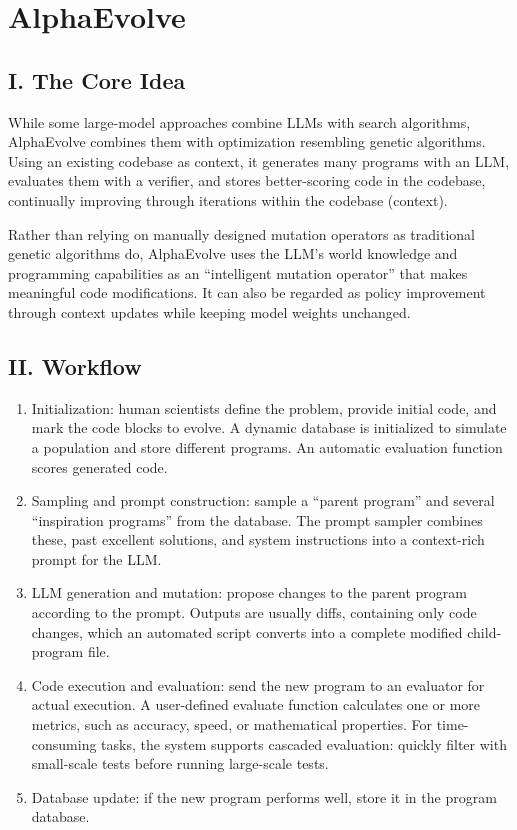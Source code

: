 \setcounter{section}{2}

\hypertarget{alphaevolve}{%
\section{AlphaEvolve}\label{alphaevolve}}

\hypertarget{i.-the-core-idea-2}{%
\subsection{I. The Core Idea}\label{i.-the-core-idea-2}}

While some large-model approaches combine LLMs with search algorithms, AlphaEvolve combines them with optimization resembling genetic algorithms. Using an existing codebase as context, it generates many programs with an LLM, evaluates them with a verifier, and stores better-scoring code in the codebase, continually improving through iterations within the codebase (context).

Rather than relying on manually designed mutation operators as traditional genetic algorithms do, AlphaEvolve uses the LLM's world knowledge and programming capabilities as an ``intelligent mutation operator'' that makes meaningful code modifications. It can also be regarded as policy improvement through context updates while keeping model weights unchanged.

\hypertarget{ii.-workflow}{%
\subsection{II. Workflow}\label{ii.-workflow}}

\begin{enumerate}
\def\labelenumi{\arabic{enumi}.}
\item
  Initialization: human scientists define the problem, provide initial code, and mark the code blocks to evolve. A dynamic database is initialized to simulate a population and store different programs. An automatic evaluation function scores generated code.
\item
  Sampling and prompt construction: sample a ``parent program'' and several ``inspiration programs'' from the database. The prompt sampler combines these, past excellent solutions, and system instructions into a context-rich prompt for the LLM.
\item
  LLM generation and mutation: propose changes to the parent program according to the prompt. Outputs are usually diffs, containing only code changes, which an automated script converts into a complete modified child-program file.
\item
  Code execution and evaluation: send the new program to an evaluator for actual execution. A user-defined evaluate function calculates one or more metrics, such as accuracy, speed, or mathematical properties. For time-consuming tasks, the system supports cascaded evaluation: quickly filter with small-scale tests before running large-scale tests.
\item
  Database update: if the new program performs well, store it in the program database.
\end{enumerate}

